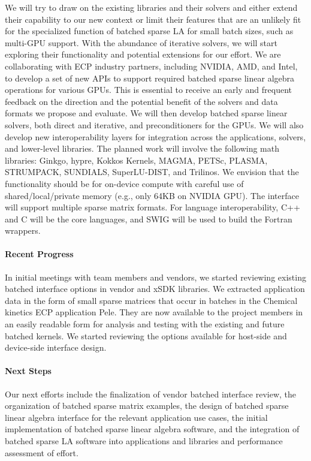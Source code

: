 We will try to draw on the existing libraries and their solvers and
either extend their capability to our new context or limit their
features that are an unlikely fit for the specialized function of
batched sparse LA for small batch sizes, such as multi-GPU support.
With the abundance of iterative solvers, we will
start exploring their functionality and potential extensions for our
effort.
We are collaborating with ECP industry partners, including NVIDIA, AMD,
and Intel, to develop a set of new APIs to support required batched
sparse linear algebra operations for various GPUs. This is essential to
receive an early and frequent feedback on the direction and the
potential benefit of the solvers and data formats we propose and
evaluate.
We will then develop batched sparse linear solvers, both direct and
iterative, and preconditioners for the GPUs. We will also develop new
interoperability layers for integration across the applications,
solvers, and lower-level libraries. The planned work will involve the
following math libraries: Ginkgo, hypre, Kokkos Kernels, MAGMA, PETSc,
PLASMA, STRUMPACK, SUNDIALS, SuperLU-DIST, and Trilinos.
We envision that the functionality
should be for on-device compute with careful use of shared/local/private
memory (e.g., only 64KB on NVIDIA GPU). The interface will support
multiple sparse matrix formats. For language interoperability, C++ and C
will be the core languages, and SWIG will be used to build the Fortran
wrappers.

\paragraph{Recent Progress}

In initial meetings with team members and vendors, we started reviewing existing batched
interface options in vendor and xSDK libraries.
We extracted application data in the form of small sparse matrices that
occur in batches in the Chemical kinetics ECP application Pele. They are now available to the
project members in an easily readable form for analysis and testing with
the existing and future batched kernels.
We started reviewing the options available for host-side and device-side
interface design.

\paragraph{Next Steps}

Our next efforts include the
%
finalization of vendor batched interface review,
the organization of batched sparse matrix examples,
the design of batched sparse linear algebra interface for the relevant application use cases,
the initial implementation of batched sparse linear algebra software, and
the integration of batched sparse LA software into applications and libraries and performance assessment of effort.
